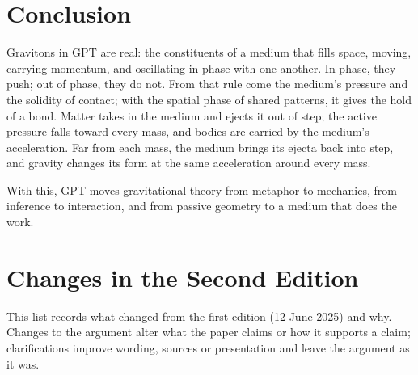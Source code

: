 \documentclass[11pt,a4paper]{article}
\begin{document}
\section*{Conclusion}

Gravitons in GPT are real: the constituents of a medium that fills space, moving, carrying momentum, and oscillating in phase with one another. In phase, they push; out of phase, they do not. From that rule come the medium's pressure and the solidity of contact; with the spatial phase of shared patterns, it gives the hold of a bond. Matter takes in the medium and ejects it out of step; the active pressure falls toward every mass, and bodies are carried by the medium's acceleration. Far from each mass, the medium brings its ejecta back into step, and gravity changes its form at the same acceleration around every mass.

With this, GPT moves gravitational theory from metaphor to mechanics, from inference to interaction, and from passive geometry to a medium that does the work.

\section*{Changes in the Second Edition}

This list records what changed from the first edition (12 June 2025) and why. Changes to the argument alter what the paper claims or how it supports a claim; clarifications improve wording, sources or presentation and leave the argument as it was.
\end{document}
